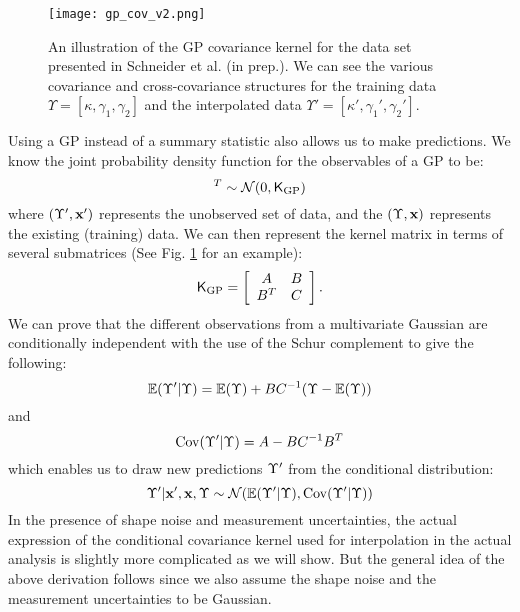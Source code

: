 \begin{figure}
	\centering
	\texttt{[image: gp\_cov\_v2.png]}
	\caption{An illustration of the GP covariance kernel for the data set
		presented in Schneider et al. (in prep.). We can see the various covariance
		and cross-covariance
		structures for the training data $\Upsilon = [\kappa, \gamma_1, \gamma_2]$
		and the interpolated data $\Upsilon' = [\kappa', \gamma_1', \gamma_2']$.
		\label{fig:GP_kernel_vis}}
\end{figure}
Using a GP instead of a summary statistic also allows us to make predictions. 
We know the joint probability density function for the observables of a GP to
be:
\begin{equation}
	[\lensparams',\lensparams]^T \sim \mathcal{N}(0, \kerngp_{\rm GP})
\end{equation}
where $(\Upsilon', \mathbf{x}')$ represents the unobserved set of data,
and the $(\Upsilon, \mathbf{x})$ represents the existing (training) data.
We can then represent the kernel matrix in terms of several submatrices 
(See Fig. \ref{fig:GP_kernel_vis} for an example):
\begin{equation}
	\mathsf{K}_{\rm GP} = \left[\begin{array}{cc}
	A & B \\
	B^T & C 
\end{array} \right].	
\end{equation}
We can prove that the different observations from a multivariate Gaussian are 
conditionally independent with the use of the Schur complement to give the following:
\begin{equation}
	\mathbb{E}(\Upsilon'|\Upsilon) = \mathbb{E}(\Upsilon) + BC^{-1}(\Upsilon - \mathbb{E}(\Upsilon))
\end{equation}
and
\begin{equation}
	\mathrm{Cov}(\Upsilon'|\Upsilon) = A - BC^{-1}B^T
\end{equation}
which enables us to draw new predictions $\Upsilon'$ from the conditional distribution:
\begin{equation} 
	\Upsilon' | \mathbf{x}', \mathbf{x}, \Upsilon \sim \mathcal{N}(
		\mathbb{E}(\Upsilon'| \Upsilon), \mathrm{Cov}(\Upsilon'|\Upsilon)
	)
\end{equation}
In the presence of shape noise and measurement uncertainties, the actual 
expression of the conditional covariance kernel used for interpolation in the actual analysis 
is slightly more complicated as we will show. 
But the general idea of the above derivation follows 
since we also assume the shape noise and the measurement uncertainties to be Gaussian.

